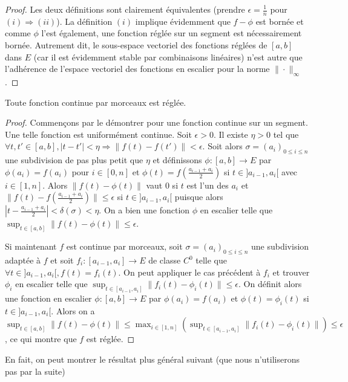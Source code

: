 \begin{proof}
Les deux définitions sont clairement équivalentes (prendre $\epsilon = \frac{1}{n}$ pour $(i) \Rightarrow (ii)$). La définition $(i)$ implique évidemment que $f - \phi$ est bornée et comme $\phi$ l'est également, une fonction réglée sur un segment est nécessairement bornée. Autrement dit, le sous-espace vectoriel des fonctions réglées de $[a,b]$ dans $E$ (car il est évidemment stable par combinaisons linéaires) n'est autre que l'adhérence de l'espace vectoriel des fonctions en escalier pour la norme $\|\cdot\|_\infty$.
\end{proof}

\begin{thm}
Toute fonction continue par morceaux est réglée.
\end{thm}

\begin{proof}
Commençons par le démontrer pour une fonction continue sur un segment. Une telle fonction est uniformément continue. Soit $\epsilon > 0$. Il existe $\eta > 0$ tel que $\forall t,t' \in [a,b], |t - t'| < \eta \Rightarrow \|f(t) - f(t')\| < \epsilon$. Soit alors $\sigma = (a_i)_{0 \leq i \leq n}$ une subdivision de pas plus petit que $\eta$ et définissons $\phi : [a,b] \to E$ par $\phi(a_i) = f(a_i)$ pour $i \in [0,n]$ et $\phi(t) = f(\frac{a_{i-1}+a_i}{2})$ si $t \in ]a_{i-1},a_i[$ avec $i \in [1,n]$. Alors $\|f(t) - \phi(t)\|$ vaut $0$ si $t$ est l'un des $a_i$ et $\|f(t) - f(\frac{a_{i-1}+a_i}{2})\| \leq \epsilon$ si $t \in ]a_{i-1},a_i[$ puisque alors $|t - \frac{a_{i-1}+a_i}{2}| < \delta(\sigma) < \eta$. On a bien une fonction $\phi$ en escalier telle que $\sup_{t \in [a,b]} \|f(t) - \phi(t)\| \leq \epsilon$.

Si maintenant $f$ est continue par morceaux, soit $\sigma = (a_i)_{0 \leq i \leq n}$ une subdivision adaptée à $f$ et soit $f_i : [a_{i-1},a_i] \to E$ de classe $C^0$ telle que $\forall t \in ]a_{i-1},a_i[, f(t) = f_i(t)$. On peut appliquer le cas précédent à $f_i$ et trouver $\phi_i$ en escalier telle que $\sup_{t \in [a_{i-1},a_i]} \|f_i(t) - \phi_i(t)\| \leq \epsilon$. On définit alors une fonction en escalier $\phi : [a,b] \to E$ par $\phi(a_i) = f(a_i)$ et $\phi(t) = \phi_i(t)$ si $t \in ]a_{i-1},a_i[$. Alors on a $\sup_{t \in [a,b]} \|f(t) - \phi(t)\| \leq \max_{i \in [1,n]} \left(\sup_{t \in [a_{i-1},a_i]} \|f_i(t) - \phi_i(t)\|\right) \leq \epsilon$, ce qui montre que $f$ est réglée.
\end{proof}

En fait, on peut montrer le résultat plus général suivant (que nous n'utiliserons pas par la suite)

